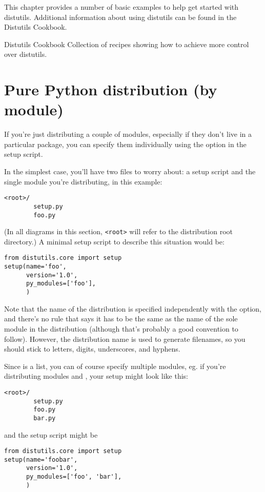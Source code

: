 \documentclass{manual}
\begin{document}
This chapter provides a number of basic examples to help get started
with distutils.  Additional information about using distutils can be
found in the Distutils Cookbook.

\begin{seealso}
          {Distutils Cookbook}
          {Collection of recipes showing how to achieve more control
           over distutils.}
\end{seealso}


\section{Pure Python distribution (by module)}
\label{pure-mod}

If you're just distributing a couple of modules, especially if they
don't live in a particular package, you can specify them individually
using the  option in the setup script.

In the simplest case, you'll have two files to worry about: a setup
script and the single module you're distributing,  in this
example:
\begin{verbatim}
<root>/
        setup.py
        foo.py
\end{verbatim}
(In all diagrams in this section, \verb|<root>| will refer to the
distribution root directory.)  A minimal setup script to describe this
situation would be:
\begin{verbatim}
from distutils.core import setup
setup(name='foo',
      version='1.0',
      py_modules=['foo'],
      )
\end{verbatim}
Note that the name of the distribution is specified independently with
the  option, and there's no rule that says it has to be the
same as the name of the sole module in the distribution (although that's
probably a good convention to follow).  However, the distribution name
is used to generate filenames, so you should stick to letters, digits,
underscores, and hyphens.

Since  is a list, you can of course specify multiple 
modules, eg. if you're distributing modules  and
, your setup might look like this:
\begin{verbatim}
<root>/
        setup.py
        foo.py
        bar.py
\end{verbatim}
and the setup script might be
\begin{verbatim}
from distutils.core import setup
setup(name='foobar',
      version='1.0',
      py_modules=['foo', 'bar'],
      )
\end{verbatim}
\end{document}
